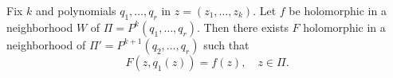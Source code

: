 
Fix $k$ and polynomials $q_1, \ldots, q_r$ in $z = (z_1, \ldots, z_k)$. Let $f$ be holomorphic in a neighborhood $W$ of $\Pi = P^k(q_1, \ldots, q_r)$. Then there exists $F$ holomorphic in a neighborhood of $\Pi' = P^{k+1}(q_2, \ldots, q_r)$ such that
$$F(z, q_1(z)) = f(z), \quad z \in \Pi.$$
